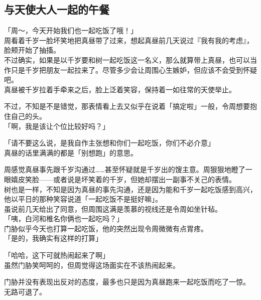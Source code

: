 \subsection{与天使大人一起的午餐}

「周～，今天开始我们也一起吃饭了哦！」\\

周看着千岁一脸坏笑地把真昼带了过来，想起真昼前几天说过『我有我的考虑』，脸颊开始了抽搐。\\

不过确实，如果是以千岁要和树一起吃饭这一名义，那么就算带上真昼，也可以当作只是千岁把朋友一起拉来了。尽管多少会让周围心生嫉妒，但应该不会受到怀疑吧。\\

真昼被千岁拉着手牵来之后，脸上泛着笑容，保持着一如往常的天使举止。

不过，不知是不是错觉，那表情看上去又似乎在说着「搞定啦」一般，令周想要抱住自己的头。\\

「啊，我是该让个位比较好吗？」

「请不要这么说，是我自作主张想和你们一起吃饭，你们不必介意」\\

真昼的话里满满的都是「别想跑」的意思。

周感觉真昼事先跟千岁沟通过……甚至怀疑就是千岁出的馊主意。周狠狠地瞪了一眼嬉皮笑脸——或者说是坏笑着的千岁，但她却摆出一副事不关己的表情。\\

树也是一样，不知是因为真昼的事先沟通，还是因为能和千岁一起吃饭感到高兴，他以平日的那种笑容说道「一起吃饭不是挺好嘛」。\\

虽说前几天给出了同意，但周围这满是羡慕的视线还是令周如坐针毡。\\

「咦，白河和椎名你俩也一起吃吗？」\\

门胁似乎今天也打算一起吃饭，他的突然出现令周微微有点胃疼。\\

「是的，我确实有这样的打算」

「哈哈，这下可就热闹起来了啊」\\

虽然门胁笑呵呵的，但周觉得这场面实在不该热闹起来。

门胁并没有表现出反对的态度，最多也只是因为真昼跑来一起吃饭而吃了一惊。\\

无路可退了。\\

